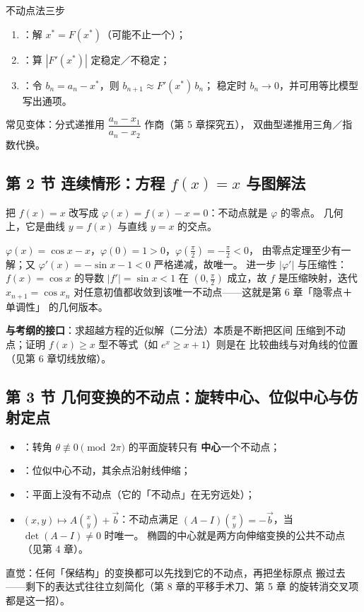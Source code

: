 \begin{methodbox}{不动点法三步}
\begin{enumerate}[label=(\arabic*), itemsep=2pt]
  \item {}：解 $x^*=F(x^*)$（可能不止一个）；
  \item {}：算 $|F'(x^*)|$ 定稳定／不稳定；
  \item {}：令 $b_n=a_n-x^*$，则 $b_{n+1}\approx F'(x^*)\,b_n$；
        稳定时 $b_n\to0$，并可用等比模型写出通项。
\end{enumerate}
常见变体：分式递推用 $\dfrac{a_n-x_1}{a_n-x_2}$ 作商（第 5 章探究五），
双曲型递推用三角／指数代换。
\end{methodbox}

\subsection{第 2 节 连续情形：方程 $f(x)=x$ 与图解法}

把 $f(x)=x$ 改写成 $\varphi(x)=f(x)-x=0$：不动点就是 $\varphi$ 的零点。
几何上，它是曲线 $y=f(x)$ 与直线 $y=x$ 的交点。
\begin{example}[方程 $x=\cos x$ 在 $(0,\tfrac\pi2)$ 内有唯一解]
\vspace{-1mm}
\begin{solution}
$\varphi(x)=\cos x-x$，$\varphi(0)=1>0$，$\varphi(\tfrac\pi2)=-\tfrac\pi2<0$，
由零点定理至少有一解；又 $\varphi'(x)=-\sin x-1<0$ 严格递减，故唯一。
进一步 $|\varphi'|$ 与压缩性：$f(x)=\cos x$ 的导数 $|f'|=\sin x<1$ 在
$(0,\tfrac\pi2)$ 成立，故 $f$ 是压缩映射，迭代 $x_{n+1}=\cos x_n$
对任意初值都收敛到该唯一不动点——这就是第 6 章「隐零点＋单调性」
的几何版本。
\end{solution}
\end{example}
\textbf{与考纲的接口}：求超越方程的近似解（二分法）本质是不断把区间
压缩到不动点；证明 $f(x)\ge x$ 型不等式（如 $e^x\ge x+1$）则是在
比较曲线与对角线的位置（见第 6 章切线放缩）。

\subsection{第 3 节 几何变换的不动点：旋转中心、位似中心与仿射定点}

\begin{itemize}
  \item {}：转角 $\theta\not\equiv0\pmod{2\pi}$ 的平面旋转只有
        \textbf{中心}一个不动点；
  \item {}：位似中心不动，其余点沿射线伸缩；
  \item {}：平面上没有不动点（它的「不动点」在无穷远处）；
  \item {} $(x,y)\mapsto A\binom xy+\vec b$：不动点满足
        $(A-I)\binom xy=-\vec b$，当 $\det(A-I)\neq0$ 时唯一。
        椭圆的中心就是两方向伸缩变换的公共不动点（见第 4 章）。
\end{itemize}
直觉：任何「保结构」的变换都可以先找到它的不动点，再把坐标原点
搬过去——剩下的表达式往往立刻简化（第 8 章的平移手术刀、第 5 章
的旋转消交叉项都是这一招）。

